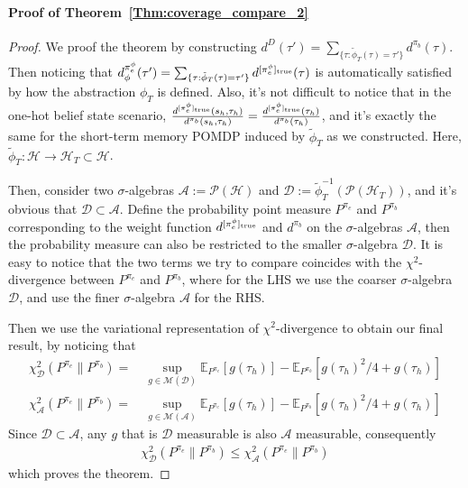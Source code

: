 \documentclass[twoside]{article}
\newcommand{\CAL}[1]{\mathcal{#1}}
\newcommand{\zyh}[1]{{\color{blue}{ [\textbf{Youheng:}} #1]}}
\begin{document}
\paragraph{Proof of Theorem~\ref{Thm:coverage_compare_2}}
\begin{proof}%
    We proof the theorem by constructing $d^D(\tau')=\sum_{\{\tau:\tilde{\phi}_T(\tau)=\tau'\}}d^{\pi_b}(\tau)$. Then noticing that $d^{\pi_e^\phi}_\phi(\tau')=\sum_{\{\tau:\tilde{\phi}_T(\tau)=\tau'\}}d^{[\pi_e^\phi]_{\rm true}}(\tau)$ is automatically satisfied by how the abstraction $\phi_T$ is defined. Also, it's not difficult to notice that in the one-hot belief state scenario, $\frac{d^{[\pi_e^\phi]_{\rm true}}(s_h,{\tau_h})}{d^{\pi_b}(s_h,{\tau_h})}=\frac{d^{[\pi_e^\phi]_{\rm true}}({\tau_h})}{d^{\pi_b}({\tau_h})}$, and it's exactly the same for the short-term memory POMDP induced by $\tilde{\phi}_T$ as we constructed. Here, $\tilde{\phi}_T:\CAL{H}\to\CAL{H}_T\subset\CAL{H}$.

    Then, consider two $\sigma$-algebras $\CAL{A}:=\CAL{P}(\CAL{H})$ and $\CAL{D}:=\tilde{\phi}_T^{-1}(\CAL{P}(\CAL{H}_T))$, and it's obvious that $\CAL{D}\subset\CAL{A}$. Define the probability point measure $P^{\pi_e}$ and $P^{\pi_b}$ corresponding to the weight function $d^{[\pi_e^\phi]_{\rm true}}$ and $d^{\pi_b}$ on the $\sigma$-algebras $\CAL{A}$, then the probability measure can also be restricted to the smaller $\sigma$-algebra $\CAL{D}$.
    It is easy to notice that the two terms we try to compare coincides with the $\chi^2$-divergence between $P^{\pi_e}$ and $P^{\pi_b}$, where for the LHS we use the coarser $\sigma$-algebra $\CAL{D}$, and use the finer $\sigma$-algebra $\CAL{A}$ for the RHS.

    Then we use the variational representation of $\chi^2$-divergence to obtain our final result, by noticing that
    \begin{align}
        \chi^2_{\CAL{D}}(P^{\pi_e}\|P^{\pi_b})=&\ \sup_{g\in \mathcal{M}(\CAL{D})}\mathbb{E}_{P^{\pi_e}}[g(\tau_h)]-\mathbb{E}_{P^{\pi_b}}[g(\tau_h)^2/4+g(\tau_h)]\\
        \chi^2_{\CAL{A}}(P^{\pi_e}\|P^{\pi_b})=&\ \sup_{g\in \mathcal{M}(\CAL{A})}\mathbb{E}_{P^{\pi_e}}[g(\tau_h)]-\mathbb{E}_{P^{\pi_b}}[g(\tau_h)^2/4+g(\tau_h)]
    \end{align}
    Since $\CAL{D}\subset\CAL{A}$, any $g$ that is $\CAL{D}$ measurable is also $\CAL{A}$ measurable, consequently
    \begin{align}
        \chi^2_{\CAL{D}}(P^{\pi_e}\|P^{\pi_b})\leq \chi^2_{\CAL{A}}(P^{\pi_e}\|P^{\pi_b})
    \end{align}
    which proves the theorem.
\end{proof}
\end{document}
